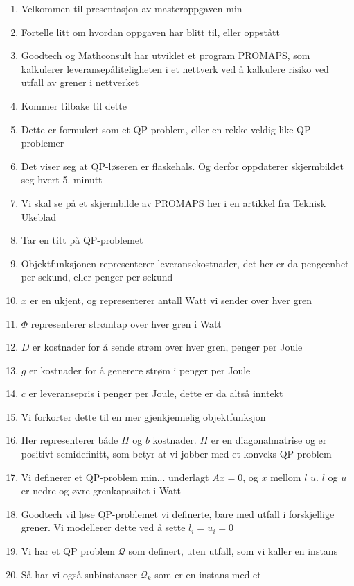 \documentclass[a4paper,twocolumn]{report}
\begin{document}
\begin{enumerate}
\item Velkommen til presentasjon av masteroppgaven min
\item Fortelle litt om hvordan oppgaven har blitt til, eller oppstått
\item Goodtech og Mathconsult har utviklet et program PROMAPS, som kalkulerer
      leveransepåliteligheten i et nettverk ved å kalkulere risiko ved utfall
      av grener i nettverket
\item Kommer tilbake til dette
\item Dette er formulert som et QP-problem, eller en rekke veldig like
      QP-problemer
\item Det viser seg at QP-løseren er flaskehals. Og derfor oppdaterer
      skjermbildet seg hvert 5. minutt
\item Vi skal se på et skjermbilde av PROMAPS her i en artikkel fra Teknisk
      Ukeblad
\item Tar en titt på QP-problemet
\item Objektfunksjonen representerer leveransekostnader, det her er da
      pengeenhet per sekund, eller penger per sekund
\item $x$ er en ukjent, og representerer antall Watt vi sender over hver gren
\item $\Phi$ representerer strømtap over hver gren i Watt
\item $D$ er kostnader for å sende strøm over hver gren, penger per Joule
\item $g$ er kostnader for å generere strøm i penger per Joule
\item $c$ er leveransepris i penger per Joule, dette er da altså inntekt
\item Vi forkorter dette til en mer gjenkjennelig objektfunksjon
\item Her representerer både $H$ og $b$ kostnader. $H$ er en diagonalmatrise og
      er positivt semidefinitt, som betyr at vi jobber med et konveks
      QP-problem
\item Vi definerer et QP-problem min... underlagt $Ax = 0$, og $x$ mellom $l$
      $u$. $l$ og $u$ er nedre og øvre grenkapasitet i Watt
\item Goodtech vil løse QP-problemet vi definerte, bare med utfall i
      forskjellige grener. Vi modellerer dette ved å sette $l_i=u_i=0$
\item Vi har et QP problem $\mathcal{Q}$ som definert, uten utfall, som vi
      kaller en instans
\item Så har vi også subinstanser $\mathcal{Q}_k$ som er en instans med et

\end{enumerate}
\end{document}
